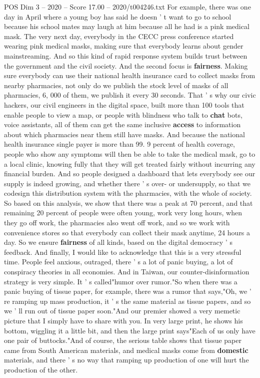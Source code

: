 \begin{textsample}{POS Dim 3 – 2020 – Score 17.00 – 2020/t004246.txt}
For example, there was one day in April where a young boy has said he doesn ' t want to go to school because his school mates may laugh at him because all he had is a pink medical mask.
The very next day, everybody in the CECC press conference started wearing pink medical masks, making sure that everybody learns about gender mainstreaming.
And so this kind of rapid response system builds trust between the government and the civil society.
And the second focus is \textbf{fairness}.
Making sure everybody can use their national health insurance card to collect masks from nearby pharmacies, not only do we publish the stock level of masks of all pharmacies, 6, 000 of them, we publish it every 30 seconds.
That ' s why our civic hackers, our civil engineers in the digital space, built more than 100 tools that enable people to view a map, or people with blindness who talk to \textbf{chat} bots, voice assistants, all of them can get the same inclusive \textbf{access} to information about which pharmacies near them still have masks.
And because the national health insurance single payer is more than 99. 9 percent of health coverage, people who show any symptoms will then be able to take the medical mask, go to a local clinic, knowing fully that they will get treated fairly without incurring any financial burden.
And so people designed a dashboard that lets everybody see our supply is indeed growing, and whether there ' s over- or undersupply, so that we codesign this distribution system with the pharmacies, with the whole of society.
So based on this analysis, we show that there was a peak at 70 percent, and that remaining 20 percent of people were often young, work very long hours, when they go off work, the pharmacies also went off work, and so we work with convenience stores so that everybody can collect their mask anytime, 24 hours a day.
So we ensure \textbf{fairness} of all kinds, based on the digital democracy ' s feedback.
And finally, I would like to acknowledge that this is a very stressful time.
People feel anxious, outraged, there ' s a lot of panic buying, a lot of conspiracy theories in all economies.
And in Taiwan, our counter-disinformation strategy is very simple.
It ' s called"humor over rumor."So when there was a panic buying of tissue paper, for example, there was a rumor that says,"Oh, we ' re ramping up mass production, it ' s the same material as tissue papers, and so we ' ll run out of tissue paper soon."And our premier showed a very memetic picture that I simply have to share with you.
In very large print, he shows his bottom, wiggling it a little bit, and then the large print says"Each of us only have one pair of buttocks."And of course, the serious table shows that tissue paper came from South American materials, and medical masks come from \textbf{domestic} materials, and there ' s no way that ramping up production of one will hurt the production of the other.

\end{textsample}
